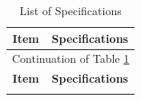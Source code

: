 \documentclass[11pt]{article}
\begin{document}
            \begin{longtable}[c]{| c | c |}
                \caption{List of Specifications\label{specifications}}\\
                \hline
                \textbf{Item} & \textbf{Specifications} \\
                \hline
                \endfirsthead

                \hline
                 \multicolumn{2}{|c|}{Continuation of Table \ref{specifications}}\\
                 \hline
                 \textbf{Item} & \textbf{Specifications} \\
                 \hline
                 \endhead
                
                 \hline
                 \endfoot
                

\end{longtable}
\end{document}
